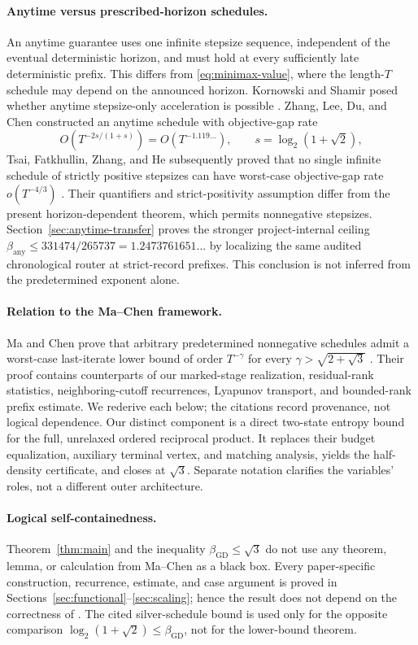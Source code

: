 \documentclass[11pt]{article}
\theoremstyle{definition}
\theoremstyle{remark}
\newcommand{\gdexp}{\beta_{\mathrm{GD}}}
\newcommand{\anyexp}{\beta_{\mathrm{any}}}
\begin{document}
\paragraph{Anytime versus prescribed-horizon schedules.}
An anytime guarantee uses one infinite stepsize sequence, independent of the
eventual deterministic horizon, and must hold at every sufficiently late
deterministic prefix.  This differs from
\eqref{eq:minimax-value}, where the length-\(T\) schedule may depend on the
announced horizon.  Kornowski and Shamir posed whether anytime stepsize-only
acceleration is possible \cite{kornowskishamir2024}.  Zhang, Lee, Du, and
Chen constructed an anytime schedule with objective-gap rate
\cite{zhangetal2025anytime}
\[
 O\!\left(T^{-2s/(1+s)}\right)=O(T^{-1.119\ldots}),
 \qquad s=\log_2(1+\sqrt2),
\]
Tsai, Fatkhullin, Zhang, and He subsequently
proved that no single infinite schedule of strictly positive stepsizes can
have worst-case objective-gap rate \(o(T^{-4/3})\)
\cite{tsaietal2026anytime}.  Their quantifiers and strict-positivity
assumption differ from the present horizon-dependent theorem, which permits
nonnegative stepsizes.  Section~\ref{sec:anytime-transfer} proves the stronger
project-internal ceiling
\(\anyexp\le331474/265737=1.2473761651\ldots\) by localizing the same
audited chronological router at strict-record prefixes.  This conclusion is
not inferred from the predetermined exponent alone.

\paragraph{Relation to the Ma--Chen framework.}
Ma and Chen prove that arbitrary predetermined nonnegative schedules admit a
worst-case last-iterate lower bound of order \(T^{-\gamma}\) for every
\(\gamma>\sqrt{2+\sqrt3}\) \cite{machen2026}.  Their proof contains
counterparts of our marked-stage realization, residual-rank statistics,
neighboring-cutoff recurrences, Lyapunov transport, and bounded-rank prefix
estimate.  We rederive each below; the citations record provenance, not
logical dependence.  Our distinct component is a direct two-state entropy
bound for the full, unrelaxed ordered reciprocal product.  It replaces their
budget equalization, auxiliary terminal vertex, and matching analysis, yields
the half-density certificate, and closes at \(\sqrt3\).  Separate notation
clarifies the variables' roles, not a different outer architecture.

\paragraph{Logical self-containedness.}
Theorem~\ref{thm:main} and the inequality
\(\gdexp\le\sqrt3\) do not use any theorem, lemma, or calculation from
Ma--Chen as a black box.  Every paper-specific construction, recurrence,
estimate, and case argument is proved in
Sections~\ref{sec:functional}--\ref{sec:scaling}; hence the result does not
depend on the correctness of \cite{machen2026}.  The cited silver-schedule
bound is used only for the opposite comparison
\(\log_2(1+\sqrt2)\le\gdexp\), not for the lower-bound theorem.
\end{document}
